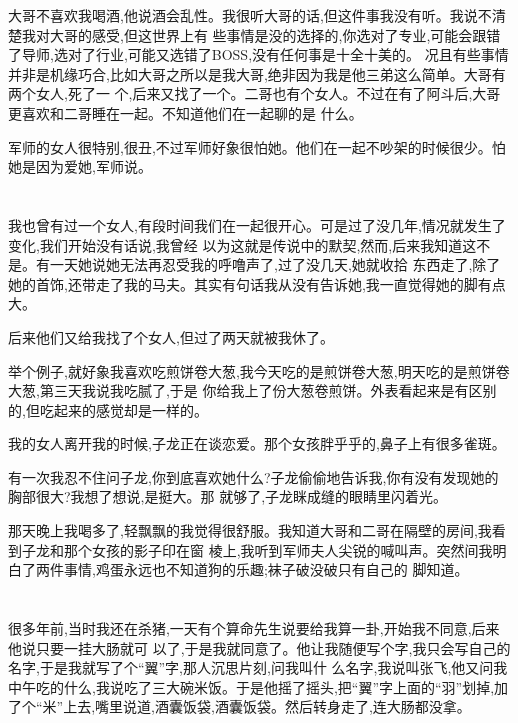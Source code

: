 ﻿\documentclass[12pt,twocolumn]{article}
\begin{document}
大哥不喜欢我喝酒,他说酒会乱性。我很听大哥的话,但这件事我没有听。我说不清楚我对大哥的感受,但这世界上有
些事情是没的选择的,你选对了专业,可能会跟错了导师,选对了行业,可能又选错了BOSS,没有任何事是十全十美的。
况且有些事情并非是机缘巧合,比如大哥之所以是我大哥,绝非因为我是他三弟这么简单。大哥有两个女人,死了一
个,后来又找了一个。二哥也有个女人。不过在有了阿斗后,大哥更喜欢和二哥睡在一起。不知道他们在一起聊的是
什么。

军师的女人很特别,很丑,不过军师好象很怕她。他们在一起不吵架的时候很少。怕她是因为爱她,军师说。

\section{}

我也曾有过一个女人,有段时间我们在一起很开心。可是过了没几年,情况就发生了变化,我们开始没有话说,我曾经
以为这就是传说中的默契,然而,后来我知道这不是。有一天她说她无法再忍受我的呼噜声了,过了没几天,她就收拾
东西走了,除了她的首饰,还带走了我的马夫。其实有句话我从没有告诉她,我一直觉得她的脚有点大。

后来他们又给我找了个女人,但过了两天就被我休了。

举个例子,就好象我喜欢吃煎饼卷大葱,我今天吃的是煎饼卷大葱,明天吃的是煎饼卷大葱,第三天我说我吃腻了,于是
你给我上了份大葱卷煎饼。外表看起来是有区别的,但吃起来的感觉却是一样的。

我的女人离开我的时候,子龙正在谈恋爱。那个女孩胖乎乎的,鼻子上有很多雀斑。

有一次我忍不住问子龙,你到底喜欢她什么?子龙偷偷地告诉我,你有没有发现她的胸部很大?我想了想说,是挺大。那
就够了,子龙眯成缝的眼睛里闪着光。

那天晚上我喝多了,轻飘飘的我觉得很舒服。我知道大哥和二哥在隔壁的房间,我看到子龙和那个女孩的影子印在窗
棱上,我听到军师夫人尖锐的喊叫声。突然间我明白了两件事情,鸡蛋永远也不知道狗的乐趣;袜子破没破只有自己的
脚知道。

\section{}

很多年前,当时我还在杀猪,一天有个算命先生说要给我算一卦,开始我不同意,后来他说只要一挂大肠就可
以了,于是我就同意了。他让我随便写个字,我只会写自己的名字,于是我就写了个``翼''字,那人沉思片刻,问我叫什
么名字,我说叫张飞,他又问我中午吃的什么,我说吃了三大碗米饭。于是他摇了摇头,把``翼''字上面的``羽''划掉,加
了个``米''上去,嘴里说道,酒囊饭袋,酒囊饭袋。然后转身走了,连大肠都没拿。
\end{document}
